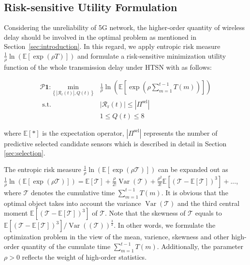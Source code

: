 \documentclass{SCIS2021}
\begin{document}
	\subsection{Risk-sensitive Utility Formulation}
	\label{ssec:risk-sensitive problem}
	Considering the unreliability of 5G network, the higher-order quantity of wireless delay should be involved in the optimal problem as mentioned in Section~\ref{sec:introduction}. In this regard, we apply entropic risk measure $\frac{1}{\rho} \ln \left(\mathbb{E}\left[\exp \left(\rho T\right)\right]\right)$ and formulate a risk-sensitive minimization utility function of the whole transmission delay under HTSN with  as follows\cite{bennis2018ultrareliable}:


	\setlength\abovedisplayskip{-16pt}
	\begin{center}
		\begin{equation}
			\begin{aligned}
				\bm{\mathcal{P}1:} \underset{\left\{\left|\mathcal{R}_\mathrm{r}(t)\right|, Q(t)\right\}}{\mathrm{min}} &\frac{1}{\rho} \ln (\mathbb{E}[\exp (\rho \sum_{m=1}^{t-1} T(m))]) \\
				\text { s.t. } &\left|\mathcal{R}_\mathrm{r}(t)\right| \leq\left| \Pi^\text{sel} \right|  \\
				&1 \leq Q(t) \leq 8
			\end{aligned}
		\end{equation}
	\end{center}
	\setlength\belowdisplayskip{-8pt}

	\vspace{-6pt}
	\noindent where $\mathbb{E}[*]$ is the expectation operator, $\left| \Pi^\text{sel} \right|$ represents the number of predictive selected candidate sensors which is described in detail in Section \ref{sec:selection}.

	\par The entropic risk measure $\frac{1}{\rho} \ln \left(\mathbb{E}\left[\exp \left(\rho \mathcal{T}\right)\right]\right)$ can be expanded out as $\frac{1}{\rho} \ln (\mathbb{E}[\exp (\rho \mathcal{T})])=\mathbb{E}[\mathcal{T}]+\frac{\rho}{2 !} \operatorname{Var}(\mathcal{T})+\frac{\rho^{2}}{3 !} \mathbb{E}\left[(\mathcal{T}-\mathbb{E}[\mathcal{T}])^{3}\right]+...$, where $\mathcal{T}$ denotes the cumulative time $\sum_{m=1}^{t-1} T(m)$. It is obvious that the optimal object takes into account the variance $\operatorname{Var}(\mathcal{T})$ and the third central moment $\mathbb{E}\left[(\mathcal{T}-\mathbb{E}[\mathcal{T}])^{3}\right]$ of $\mathcal{T}$. Note that the skewness of $\mathcal{T}$ equals to $\mathbb{E}\left[(\mathcal{T}-\mathbb{E}[\mathcal{T}])^{3}\right] / \operatorname{Var}((\mathcal{T}))^{\frac{3}{2}}$. In other words, we formulate the optimization problem in the view of the mean, varience, skewness and other high-order quantity of the cumulate time $\sum_{m=1}^{t-1} T(m)$. Additionally, the parameter $\rho > 0$ reflects the weight of high-order statistics.
\end{document}

